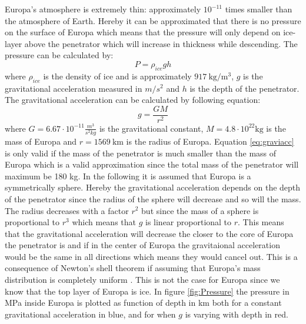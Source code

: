 



\label{sec:Pressure}
Europa's atmosphere is extremely thin: approximately $10^{-11}$ times smaller than the atmosphere of Earth\cite{hall1995a}. Hereby it can be approximated that there is no pressure on the surface of Europa which means that the pressure will only depend on ice-layer above the penetrator which will increase in thickness while descending. The pressure can be calculated by: 
\begin{equation}
P = \rho_{ice} g h
\end{equation}
where $\rho_{ice}$ is the density of ice and is approximately $\SI{917}{\kilo\gram\per\cubic\metre}$\cite{cutnell2007a}, $g$ is the gravitational acceleration measured in $m/s^2$ and $h$ is the depth of the penetrator. The gravitational acceleration can be calculated by following equation:
\begin{equation}\label{eq:graviacc}
g = \frac{GM}{r^2}
\end{equation} 
where $G = 6.67\cdot 10^{-11}\frac{m^3}{s^2 kg}$ is the gravitational constant, $M = 4.8\cdot 10^{22}\text{kg}$ is the mass of Europa and $r = \SI{1569}{\km}$ is the radius of Europa\cite{website:propeuropa}. Equation \ref{eq:graviacc} is only valid if the mass of the penetrator is much smaller than the mass of Europa which is a valid approximation since the total mass of the penetrator will maximum be 180 kg. In the following it is assumed that Europa is a symmetrically sphere. Hereby the gravitational acceleration depends on the depth of the penetrator since the radius of the sphere will decrease and so will the mass. The radius decreases with a factor $r^2$ but since the mass of a sphere is proportional to $r^3$ which means that $g$ is linear proportional to $r$. This means that the gravitational acceleration will decrease the closer to the core of Europa the penetrator is and if in the center of Europa the gravitaional acceleration would be the same in all directions which means they would cancel out. This is a consequence of Newton's shell theorem if assuming that Europa's mass distribution is completely uniform \cite{website:shelltheorem}. This is not the case for Europa since we know that the top layer of Europa is ice. In figure \ref{fig:Pressure} the pressure in MPa inside Europa is plotted as function of depth in km both for a constant gravitational acceleration in blue, and for when $g$ is varying with depth in red.  
